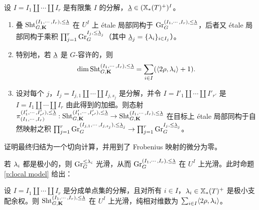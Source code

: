 \begin{prop}\label{p:local model} 设 $I=I_{1}\coprod\cdots\coprod I_{r}$ 是有限集 $I$ 的分解，$\underline{\lambda}\in (\mathbb{X}_*(T)^{+})^{I}$。

\begin{enumerate}
\item 叠 $\textup{Sht}^{(I_{1},\cdots, I_{r}), \le \underline{\lambda}}_{G,\mathbf{K}}$ 在 $U^{I}$ 上 étale 局部同构于 $\textup{Gr}^{(I_{1},\cdots, I_{r}), \le\underline{\lambda}}_{G}$，后者又 étale 局部同构于乘积 $\prod_{j=1}^{r}\textup{Gr}^{I_{j},\le\underline{\lambda}_{j}}_{G}$（其中 $\underline{\lambda}_{j}=\{\lambda_{i}\}_{i\in I_{j}}$）。
\item 特别地，若 $\underline{\lambda}$ 是 $G$-容许的，则
\begin{equation*}
\dim \textup{Sht}^{(I_{1},\cdots, I_{r}),\le\underline{\lambda}}_{G,\mathbf{K}}=\sum_{i\in I}(\langle{2\rho, \lambda_{i}}\rangle+1).
\end{equation*}
\item 设对每个 $j$，$I_{j}=I_{j,1}\coprod\cdots\coprod I_{j,s_{j}}$ 是分解，并令 $I=I'_{1}\coprod\cdots\coprod I'_{r'}$ 是 $I=I_{1}\coprod\cdots\coprod I_{r}$ 由此得到的加细。则态射 $\pi^{(I'_{1},\cdots, I'_{r'}),\le\underline{\lambda}}_{(I_{1},\cdots, I_{r})}: \textup{Sht}^{(I'_{1},\cdots, I'_{r'}), \le \underline{\lambda}}_{G,\mathbf{K}}\to \textup{Sht}^{(I_{1},\cdots, I_{r}), \le \underline{\lambda}}_{G,\mathbf{K}}$ 在目标上 étale 局部同构于自然映射之积 $\prod_{j=1}^{r}\textup{Gr}^{(I_{j,1},\cdots, I_{j,s_{j}}),\le\underline{\lambda}_{j}}_{G}\to \prod_{j=1}^{r}\textup{Gr}^{I_{j},\le\underline{\lambda}_{j}}_{G}$。
\end{enumerate}
\end{prop}
证明最终归结为一个切向计算，并用到了 Frobenius 映射的微分为零。

若 $\lambda_{i}$ 都是极小的，则 $\textup{Gr}^{\le\lambda_{i}}_{G}$ 光滑，从而 $\textup{Gr}^{(I_{1},\cdots, I_{r}), \le\underline{\lambda}}_{G}$ 在 $U^{I}$ 上光滑。此时命题 \ref{p:local model} 给出：
\begin{cor}\label{c:Sht sm} 设 $I=I_{1}\coprod\cdots\coprod I_{r}$ 是分成单点集的分解，且对所有 $i\in I$，$\lambda_{i}\in \mathbb{X}_*(T)^{+}$ 是极小支配余权。则 $\textup{Sht}^{(I_{1},\cdots, I_{r}),\le\underline{\lambda}}_{G,\mathbf{K}}$ 在 $U^{I}$ 上光滑，纯相对维数为 $\sum_{i\in I}\langle{2\rho, \lambda_{i}}\rangle$。
\end{cor}
